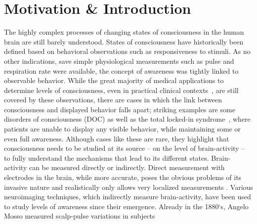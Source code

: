 \chapter{Motivation \& Introduction}\label{ch:introduction}




The highly complex processes of changing states of consciousness in the human brain are still barely understood.
States of consciousness have historically been defined based on behavioral observations such as responsiveness to
stimuli.
As no other indications, save simple physiological measurements such as pulse and respiration rate
were available, the concept of awareness was tightly linked to observable behavior.
While the great majority of medical applications to determine levels of consciousness,
even in practical clinical contexts~\cite{jain_glasgow_2022},
are still covered by these observations,
there are cases in which the link between consciousness and displayed behavior falls apart;
striking examples are some disorders of consciousness (DOC) as well as the total locked-in
syndrome~\cite{bauer_varieties_1979},
where patients are unable to display any visible behavior,
while maintaining some or even full awareness.
Although cases like these are rare, they highlight that consciousness needs to be studied at its source -- on the
level of brain-activity -- to fully understand the mechanisms that lead to its different states.
%
%
Brain-activity can be measured directly or indirectly.
Direct measurement with electrodes in the brain, while more accurate,
poses the obvious problems of its invasive nature and realistically only
allows very localized measurements \citationneeded.
Various neuroimaging techniques, which indirectly measure brain-activity, have been used to study levels of
awareness since their emergence.
Already in the 1880`s, Angelo Mosso measured scalp-pulse variations in subjects
